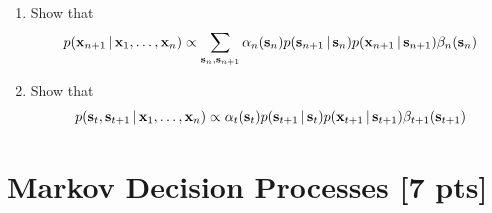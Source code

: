 \documentclass[submit]{harvardml}
\begin{document}
\begin{problem}
%
  \begin{enumerate}
    \item Show that
$$
p(\mathbf{x}_{n+1}\,|\, \mathbf{x}_1,\ldots,\mathbf{x}_n)
\propto\sum_{\mathbf{s}_n, \mathbf{s}_{n+1}}\alpha_n(\mathbf{s}_n)
p(\mathbf{s}_{n+1}\,|\, \mathbf{s}_n)
p(\mathbf{x}_{n+1}\,|\, \mathbf{s}_{n+1})\beta_n(\mathbf{s}_n)$$

\item Show that
$$
p(\mathbf{s}_t,\mathbf{s}_{t+1}\,|\, \mathbf{x}_1,\ldots,\mathbf{x}_n)
  \propto\alpha_t(\mathbf{s}_t)p(\mathbf{s}_{t+1}\,|\,\mathbf{s}_t)p(\mathbf{x}_{t+1}\,|\,\mathbf{s}_{t+1})\beta_{t+1}(\mathbf{s}_{t+1})
$$
  \end{enumerate}
\end{problem}


\newpage
\section*{Markov Decision Processes [7 pts]}
\end{document}
